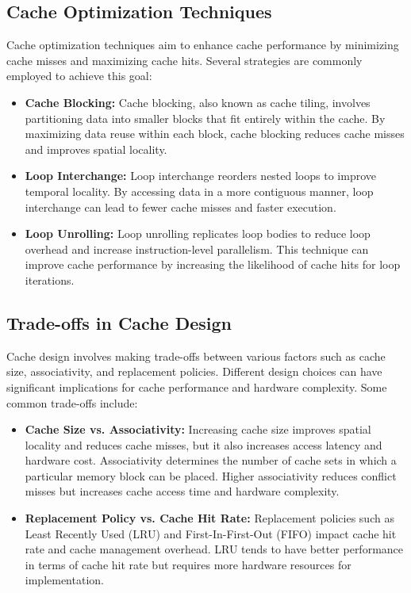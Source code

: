 \documentclass[12pt]{book} %
\begin{document}
\subsection{Cache Optimization Techniques}

Cache optimization techniques aim to enhance cache performance by minimizing cache misses and maximizing cache hits. Several strategies are commonly employed to achieve this goal:

\begin{itemize}
    \item \textbf{Cache Blocking:} Cache blocking, also known as cache tiling, involves partitioning data into smaller blocks that fit entirely within the cache. By maximizing data reuse within each block, cache blocking reduces cache misses and improves spatial locality.
    
    \item \textbf{Loop Interchange:} Loop interchange reorders nested loops to improve temporal locality. By accessing data in a more contiguous manner, loop interchange can lead to fewer cache misses and faster execution.
    
    \item \textbf{Loop Unrolling:} Loop unrolling replicates loop bodies to reduce loop overhead and increase instruction-level parallelism. This technique can improve cache performance by increasing the likelihood of cache hits for loop iterations.
\end{itemize}

\subsection{Trade-offs in Cache Design}

Cache design involves making trade-offs between various factors such as cache size, associativity, and replacement policies. Different design choices can have significant implications for cache performance and hardware complexity. Some common trade-offs include:

\begin{itemize}
    \item \textbf{Cache Size vs. Associativity:} Increasing cache size improves spatial locality and reduces cache misses, but it also increases access latency and hardware cost. Associativity determines the number of cache sets in which a particular memory block can be placed. Higher associativity reduces conflict misses but increases cache access time and hardware complexity.
    
    \item \textbf{Replacement Policy vs. Cache Hit Rate:} Replacement policies such as Least Recently Used (LRU) and First-In-First-Out (FIFO) impact cache hit rate and cache management overhead. LRU tends to have better performance in terms of cache hit rate but requires more hardware resources for implementation.
\end{itemize}
\end{document}
